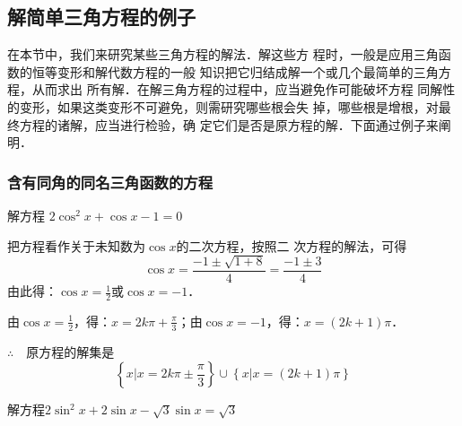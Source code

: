 \subsection{解简单三角方程的例子}
在本节中，我们来研究某些三角方程的解法．解这些方
程时，一般是应用三角函数的恒等变形和解代数方程的一般
知识把它归结成解一个或几个最简单的三角方程，从而求出
所有解．在解三角方程的过程中，应当避免作可能破坏方程
同解性的变形，如果这类变形不可避免，则需研究哪些根会失
掉，哪些根是增根，对最终方程的诸解，应当进行检验，确
定它们是否是原方程的解．下面通过例子来阐明．

\subsubsection{含有同角的同名三角函数的方程}
\begin{example}
    解方程
 $   2\cos^2x+\cos x-1=0$
\end{example}

\begin{solution}
    把方程看作关于未知数为$\cos x$的二次方程，按照二
次方程的解法，可得
\[\cos x=\frac{-1\pm\sqrt{1+8}}{4}=\frac{-1\pm 3}{4}\]
由此得：$\cos x=\frac{1}{2}$或$\cos x=-1$．

由$\cos x=\frac{1}{2}$，得：$x=2k\pi+\frac{\pi}{3}$；由$\cos x=-1$，得：$x=(2k+1)\pi$．

$\therefore\quad $原方程的解集是
\[\left\{x\big| x=2k\pi\pm \frac{\pi}{3}\right\}\cup \left\{x\big| x=(2k+1)\pi \right\}\]
\end{solution}

\begin{example}
    解方程$2\sin^2x+2\sin x-\sqrt{3}\sin x=\sqrt{3}$
\end{example}

